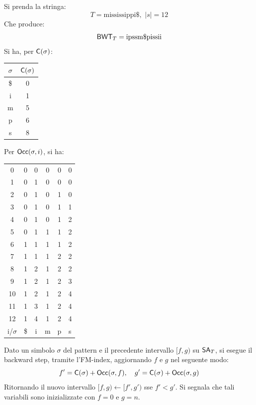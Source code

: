 \begin{esempio}
  Si prenda la stringa:
  \[T=\mbox{mississippi\$},\,\,|s|=12\]
  Che produce:
  \[\mbox{\rm {\sf BWT}}_T=\mbox{ipssm\$pissii}\]
  Si ha, per $\mbox{\rm {\sf C}}(\sigma)$:
  \begin{table}[H]
    \centering
    \begin{tabular}{c||c}
      $\sigma$ & $\mbox{\rm {\sf C}}(\sigma)$\\
      \hline
      \hline
      \$ & 0\\
      i & 1 \\
      m & 5\\
      p & 6\\
      s & 8\\
    \end{tabular}
  \end{table}
  Per $\mbox{\rm {\sf Occ}}(\sigma, i)$, si ha:
  \begin{table}[H]
    \centering
    \begin{tabular}{c||c|c|c|c|c}
      0 & 0 & 0 & 0 & 0 & 0 \\
      1 & 0 & 1 & 0 & 0 & 0 \\
      2 & 0 & 1 & 0 & 1 & 0 \\
      3 & 0 & 1 & 0 & 1 & 1 \\
      4 & 0 & 1 & 0 & 1 & 2 \\
      5 & 0 & 1 & 1 & 1 & 2 \\
      6 & 1 & 1 & 1 & 1 & 2 \\
      7 & 1 & 1 & 1 & 2 & 2 \\
      8 & 1 & 2 & 1 & 2 & 2 \\
      9 & 1 & 2 & 1 & 2 & 3 \\
      10 & 1 & 2 & 1 & 2 & 4 \\
      11 & 1 & 3 & 1 & 2 & 4 \\
      12 & 1 & 4 & 1 & 2 & 4 \\
      \hline
      \hline
      i/$\sigma$ & \$ & i & m & p & s
    \end{tabular}
  \end{table}
\end{esempio}
Dato un simbolo $\sigma$ del pattern e il precedente intervallo $[f,g)$ su
$\mbox{\rm {\sf SA}}_T$, si esegue il backward step, tramite l'FM-index,
aggiornando $f$ e $g$ nel seguente modo: 
\begin{equation}
  \label{eq:bwt6}
  f'=\mbox{\rm {\sf C}}(\sigma)+\mbox{\rm {\sf Occ}}(\sigma, f),\quad g'=\mbox{\rm {\sf C}}(\sigma)+\mbox{\rm {\sf Occ}}(\sigma, g)
\end{equation}
Ritornando il nuovo intervallo $[f, g)\gets [f', g')$ sse $f'< g'$.
Si segnala che tali variabili sono inizializzate con $f=0$ e $g=n$.\\
